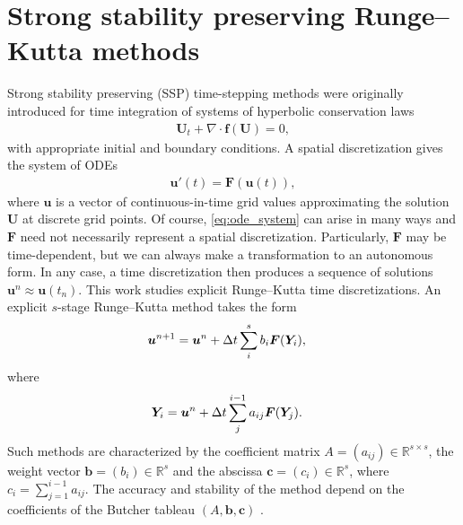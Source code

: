 \documentclass[final]{siamltex}  %
\begin{document}
\section{Strong stability preserving Runge--Kutta methods}\label{sec:SSP}
Strong stability preserving (SSP) time-stepping methods were originally introduced
for time integration of systems of hyperbolic conservation laws
\cite{Shu/Osher:1988} 
\begin{align}\label{eq:pde}
	\bm{U}_t + \nabla \cdot \bm{f}(\bm{U}) = 0,   
\end{align}
with appropriate initial and boundary conditions.
A spatial discretization gives the system of ODEs
\begin{align}\label{eq:ode_system}
    \bm{u}'(t) = \bm{F}(\bm{u}(t)),
\end{align}
where $\bm{u}$ is a vector of continuous-in-time grid values approximating 
the solution $\bm{U}$ at discrete grid points.
Of course, \eqref{eq:ode_system} can arise in many ways and $\bm{F}$
need not necessarily represent a spatial discretization.
Particularly, $\bm{F}$ may be time-dependent, but we can always make a 
transformation to an autonomous form.
In any case, a time discretization then produces a sequence of
solutions $\bm{u}^{n} \approx \bm{u}(t_n)$.
This work studies explicit Runge--Kutta time discretizations.
An explicit $s$-stage Runge--Kutta method takes the form
\begin{align*}
	\bm{u}^{n+1} &= \bm{u}^{n} + \Delta t \sum_i^s b_i \bm{F}(\bm{Y}_i), 
\end{align*}
where
\begin{align*}
	\bm{Y}_i &= \bm{u}^{n} + \Delta t \sum_j^{i-1} a_{ij} \bm{F}(\bm{Y}_j).
\end{align*}
Such methods are characterized by the coefficient matrix $A = (a_{ij}) \in 
\mathbb{R}^{s \times s}$, the weight vector $\bm{b} = (b_i) \in \mathbb{R}^s$
and the abscissa $\bm{c} = (c_i) \in \mathbb{R}^s$, where 
$c_i = \sum_{j=1}^{i-1}a_{ij}$.
The accuracy and stability of the method depend on the coefficients of the 
Butcher tableau $(A,\bm{b},\bm{c})$ \cite{Butcher2008_book}.
\end{document}
